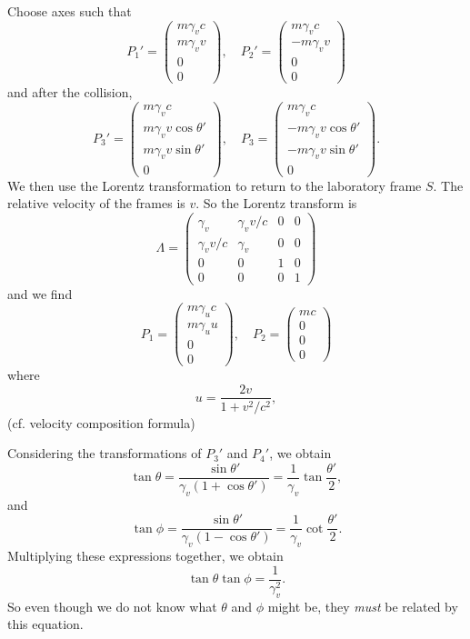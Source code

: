 \documentclass[a4paper]{article}
\begin{document}
Choose axes such that 
\[
  P_1' = 
  \begin{pmatrix}
    m\gamma_v c\\
    m\gamma_v v\\
    0\\
    0
  \end{pmatrix},\quad
  P_2' = 
  \begin{pmatrix}
    m\gamma_v c\\
    -m\gamma_v v\\
    0\\
    0
  \end{pmatrix}
\]
and after the collision,
\[
  P_3' = 
  \begin{pmatrix}
    m\gamma_v c\\
    m\gamma_v v\cos \theta'\\
    m\gamma_v v\sin \theta'\\
    0
  \end{pmatrix},\quad
  P_3 = 
  \begin{pmatrix}
    m\gamma_v c\\
    -m\gamma_v v\cos \theta'\\
    -m \gamma_v v\sin \theta'\\
    0
  \end{pmatrix}.
\]
We then use the Lorentz transformation to return to the laboratory frame $S$. The relative velocity of the frames is $v$. So the Lorentz transform is
\[
  \Lambda = 
  \begin{pmatrix}
    \gamma_v & \gamma_v v/c & 0 & 0\\
    \gamma_v v/c & \gamma_v & 0 & 0\\
    0 & 0 & 1 & 0\\
    0 & 0 & 0 & 1
  \end{pmatrix}
\]
and we find
\[
  P_1 =
  \begin{pmatrix}
    m\gamma_u c\\
    m\gamma_u u\\
    0\\
    0
  \end{pmatrix},\quad
  P_2 = 
  \begin{pmatrix}
    mc\\
    0\\
    0\\
    0
  \end{pmatrix}
\]
where
\[
  u = \frac{2v}{1 + v^2/c^2},
\]
(cf. velocity composition formula)

Considering the transformations of $P_3'$ and $P_4'$, we obtain
\[
  \tan \theta = \frac{\sin \theta'}{\gamma_v (1 + \cos \theta')} = \frac{1}{\gamma_v}\tan \frac{\theta'}{2},
\]
and
\[
  \tan \phi = \frac{\sin \theta'}{\gamma_v(1 - \cos \theta')} = \frac{1}{\gamma_v}\cot \frac{\theta'}{2}.
\]
Multiplying these expressions together, we obtain
\[
  \tan \theta\tan \phi = \frac{1}{\gamma_v^2}.
\]
So even though we do not know what $\theta$ and $\phi$ might be, they \emph{must} be related by this equation.
\end{document}

